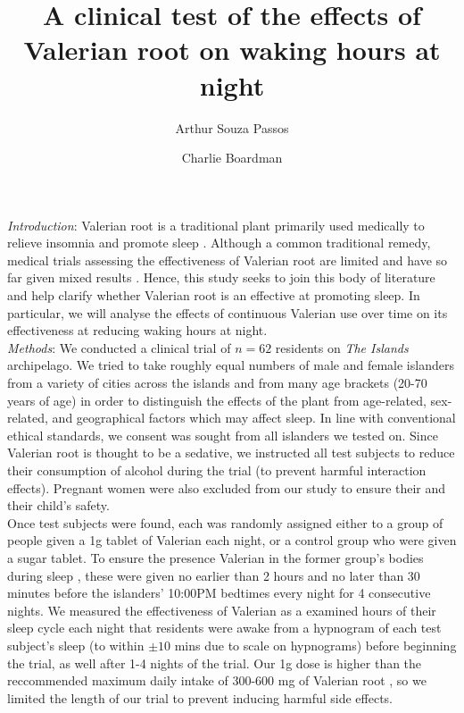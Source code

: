 \documentclass[10pt,preprintnumbers,amsmath,amssymb,floatfix,twocolumn,prl]{revtex4-2}
\begin{document}
\title{A clinical test of the effects of Valerian root on waking hours at night}
\author{Arthur Souza Passos}
\author{Charlie Boardman}

\maketitle

\textit{Introduction}: Valerian root is a traditional plant primarily used medically to relieve insomnia and promote sleep \cite{ValerianSource1}. Although a common traditional remedy, medical trials assessing the effectiveness of Valerian root are limited and have so far given mixed results \cite{ValerianSource2}. Hence, this study seeks to join this body of literature and help clarify whether Valerian root is an effective at promoting sleep. In particular, we will analyse the effects of continuous Valerian use over time on its effectiveness at reducing waking hours at night. \\

\textit{Methods}: 
We conducted a clinical trial of $n=62$ residents on \emph{The Islands} archipelago. We tried to take roughly equal numbers of male and female islanders from a variety of cities across the islands and from many age brackets (20-70 years of age) in order to distinguish the effects of the plant from age-related, sex-related, and geographical factors which may affect sleep. In line with conventional ethical standards, we consent was sought from all islanders we tested on. Since Valerian root is thought to be a sedative, we instructed all test subjects to reduce their consumption of alcohol during the trial (to prevent harmful interaction effects). Pregnant women were also excluded from our study to ensure their and their child’s safety. \\

Once test subjects were found, each was randomly assigned either to a group of people given a 1g tablet of Valerian each night, or a control group who were given a sugar tablet. To ensure the presence Valerian in the former group's bodies during sleep \cite{ValerianSource1}, these were given no earlier than 2 hours and no later than 30 minutes before the islanders' 10:00PM bedtimes every night for 4 consecutive nights. We measured the effectiveness of Valerian as a  examined hours of their sleep cycle each night that residents were awake from a hypnogram of each test subject’s sleep (to within $\pm10$ mins due to scale on hypnograms) before beginning the trial, as well after 1-4 nights of the trial. Our 1g dose is higher than the reccommended maximum daily intake of 300-600 mg of Valerian root \cite{ValerianSource1}, so we limited the length of our trial to prevent inducing harmful side effects. \\
\end{document}
